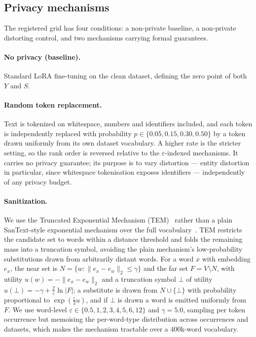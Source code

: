 \subsection{\label{sec:mech}Privacy mechanisms}
The registered grid has four conditions:
a non-private baseline,
a non-private distorting control,
and two mechanisms carrying formal guarantees.

\paragraph{No privacy (baseline).}
Standard LoRA fine-tuning on the clean dataset,
defining the zero point of both $Y$ and $S$.

\paragraph{Random token replacement.}
Text is tokenized on whitespace,
numbers and identifiers included,
and each token is independently replaced with probability $p \in \{0.05, 0.15, 0.30, 0.50\}$ by a token drawn uniformly from its own dataset vocabulary.
A higher rate is the stricter setting,
so the rank order is reversed relative to the $\varepsilon$-indexed mechanisms.
It carries no privacy guarantee; its purpose is to vary distortion --- entity distortion in particular, since whitespace tokenisation exposes identifiers --- independently of any privacy budget.

\paragraph{Sanitization.}
We use the Truncated Exponential Mechanism (TEM)~\citep{carvalho2021tem} rather than a plain SanText-style exponential mechanism over the full vocabulary~\citep{yue2021differential}.
TEM restricts the candidate set to words within a distance threshold and folds the remaining mass into a truncation symbol,
avoiding the plain mechanism's low-probability substitutions drawn from arbitrarily distant words.
For a word $x$ with embedding $e_x$, the near set is
$N = \{w : \lVert e_x - e_w \rVert_2 \le \gamma\}$ and the far set
$F = V \setminus N$, with utility $u(w) = -\lVert e_x - e_w \rVert_2$ and a
truncation symbol $\bot$ of utility $u(\bot) = -\gamma + \tfrac{2}{\varepsilon}
\ln|F|$; a substitute is drawn from $N \cup \{\bot\}$ with probability
proportional to $\exp(\tfrac{\varepsilon}{2} u)$, and if $\bot$ is drawn a word
is emitted uniformly from $F$.
We use word-level $\varepsilon \in \{0.5, 1, 2, 3, 4, 5, 6, 12\}$ and $\gamma = 5.0$,
sampling per token occurrence but memoising the per-word-type distribution across occurrences and datasets,
which makes the mechanism tractable over a $400$k-word vocabulary.

